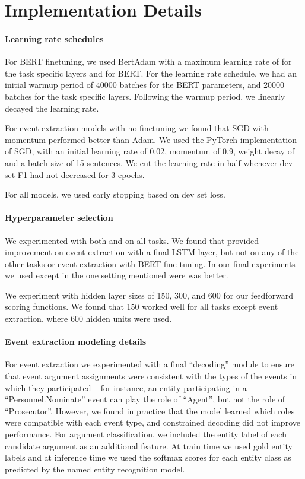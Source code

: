 \documentclass[11pt,a4paper]{article}
\begin{document}
\section{Implementation Details} \label{sec:implementation}
\paragraph{Learning rate schedules}
For BERT finetuning, we used BertAdam with a maximum learning rate of  for the task specific layers and  for BERT. For the learning rate schedule, we had an initial warmup period of 40000 batches for the BERT parameters, and 20000 batches for the task specific layers. Following the warmup period, we linearly decayed the learning rate.

For event extraction models with no finetuning we found that SGD with momentum performed better than Adam. We used the PyTorch implementation of SGD, with an initial learning rate of 0.02, momentum of 0.9, weight decay of  and a batch size of 15 sentences. We cut the learning rate in half whenever dev set F1 had not decreased for 3 epochs.

For all models, we used early stopping based on dev set loss.

\paragraph{Hyperparameter selection}
We experimented with both  and  on all tasks. We found that  provided improvement on event extraction with a final LSTM layer, but not on any of the other tasks or event extraction with BERT fine-tuning. In our final experiments we used  except in the one setting mentioned were  was better.

We experiment with hidden layer sizes of 150, 300, and 600 for our feedforward scoring functions. We found that 150 worked well for all tasks except event extraction, where 600 hidden units were used.

\paragraph{Event extraction modeling details} For event extraction we experimented with a final ``decoding'' module to ensure that event argument assignments were consistent with the types of the events in which they participated -- for instance, an entity participating in a ``Personnel.Nominate'' event can play the role of ``Agent'', but not the role of ``Prosecutor''. However, we found in practice that the model learned which roles were compatible with each event type, and constrained decoding did not improve performance. For argument classification, we included the entity label of each candidate argument as an additional feature. At train time we used gold entity labels and at inference time we used the  softmax scores for each entity class as predicted by the named entity recognition model.
\end{document}
